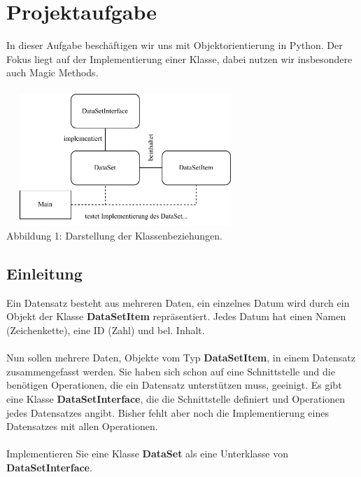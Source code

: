 \documentclass[
 12pt, %
 a4paper, %
 parskip=full %
]{scrartcl}
\begin{document}
\tableofcontents

\section{Projektaufgabe}
In dieser Aufgabe beschäftigen wir uns mit Objektorientierung in Python.
Der Fokus liegt auf der Implementierung einer Klasse, dabei nutzen wir insbesondere auch Magic Methods.\\
\\
\hspace*{2cm}\includegraphics[width=9cm, height=5cm]{./../diagram/classes_files.pdf}\\
\hspace*{3cm}\scriptsize Abbildung 1: \normalfont Darstellung der Klassenbeziehungen.\normalsize\\

\subsection{Einleitung}
Ein Datensatz besteht aus mehreren Daten, ein einzelnes Datum wird durch ein Objekt der Klasse \textbf{DataSetItem} repräsentiert.
Jedes Datum hat einen Namen (Zeichenkette), eine ID (Zahl) und bel. Inhalt.\\
\\
Nun sollen mehrere Daten, Objekte vom Typ \textbf{DataSetItem}, in einem Datensatz zusammengefasst werden.
Sie haben sich schon auf eine Schnittstelle und die benötigen Operationen, die ein Datensatz unterstützen muss, geeinigt.
Es gibt eine Klasse \textbf{DataSetInterface}, die die Schnittstelle definiert und Operationen jedes Datensatzes angibt.
Bisher fehlt aber noch die Implementierung eines Datensatzes mit allen Operationen.\\
\\
Implementieren Sie eine Klasse \textbf{DataSet} als eine Unterklasse von \textbf{DataSetInterface}.\\
\\
\end{document}
